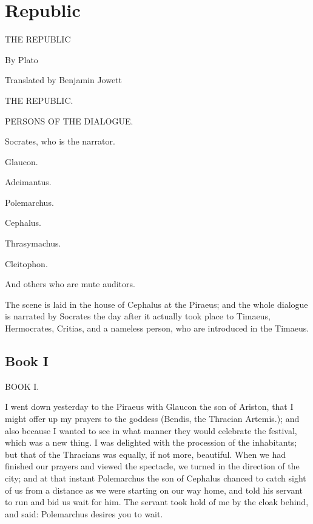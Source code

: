 
\chapter{Republic} %
\label{cha:republic}





THE REPUBLIC

By Plato


Translated by Benjamin Jowett



THE REPUBLIC.




PERSONS OF THE DIALOGUE.

Socrates, who is the narrator.

Glaucon.

Adeimantus.

Polemarchus.

Cephalus.

Thrasymachus.

Cleitophon.

And others who are mute auditors.

The scene is laid in the house of Cephalus at the Piraeus; and the whole
dialogue is narrated by Socrates the day after it actually took place to
Timaeus, Hermocrates, Critias, and a nameless person, who are introduced
in the Timaeus.


\section{Book I} %
\label{sec:book_i}



BOOK I.

I went down yesterday to the Piraeus with Glaucon the son of Ariston,
that I might offer up my prayers to the goddess (Bendis, the Thracian
Artemis.); and also because I wanted to see in what manner they would
celebrate the festival, which was a new thing. I was delighted with the
procession of the inhabitants; but that of the Thracians was equally,
if not more, beautiful. When we had finished our prayers and viewed the
spectacle, we turned in the direction of the city; and at that instant
Polemarchus the son of Cephalus chanced to catch sight of us from a
distance as we were starting on our way home, and told his servant to
run and bid us wait for him. The servant took hold of me by the cloak
behind, and said: Polemarchus desires you to wait.

